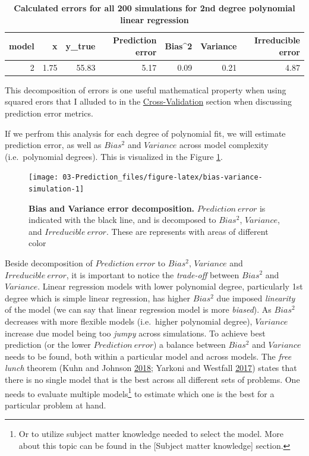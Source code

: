 \documentclass[
]{book}
\begin{document}
\begin{table}

\caption{\label{tab:example-error-decomposition}\textbf{Calculated errors for all 200 simulations for 2nd degree polynomial linear regression}}
\centering
\begin{tabular}[t]{rrrrrrr}
\toprule
model & x & y\_true & Prediction error & Bias\textasciicircum{}2 & Variance & Irreducible error\\
\midrule
2 & 1.75 & 55.83 & 5.17 & 0.09 & 0.21 & 4.87\\
\bottomrule
\end{tabular}
\end{table}

This decomposition of errors is one useful mathematical property when using squared erors that I alluded to in the \protect\hyperlink{cross-validation}{Cross-Validation} section when discussing prediction error metrics.

If we perfrom this analysis for each degree of polynomial fit, we will estimate prediction error, as well as \(Bias^2\) and \(Variance\) across model complexity (i.e.~polynomial degrees). This is visualized in the Figure \ref{fig:bias-variance-simulation}.

\begin{figure}

{\centering \texttt{[image: 03-Prediction\_files/figure-latex/bias-variance-simulation-1]} 

}

\caption{\textbf{Bias and Variance error decomposition. }\(Prediction \: error\) is indicated with the black line, and is decomposed to \(Bias^2\), \(Variance\), and \(Irreducible \: error\). These are represents with areas of different color}\label{fig:bias-variance-simulation}
\end{figure}



Beside decomposition of \(Prediction \: error\) to \(Bias^2\), \(Variance\) and \(Irreducible \: error\), it is important to notice the \emph{trade-off} between \(Bias^2\) and \(Variance\). Linear regression models with lower polynomial degree, particularly 1st degree which is simple linear regression, has higher \(Bias^2\) due imposed \emph{linearity} of the model (we can say that linear regression model is more \emph{biased}). As \(Bias^2\) decreases with more flexible models (i.e.~higher polynomial degree), \(Variance\) increase due model being too \emph{jumpy} across simulations. To achieve best prediction (or the lower \(Prediction \: error\)) a balance between \(Bias^2\) and \(Variance\) needs to be found, both within a particular model and across models. The \emph{free lunch} theorem (Kuhn and Johnson \protect\hyperlink{ref-kuhnAppliedPredictiveModeling2018}{2018}; Yarkoni and Westfall \protect\hyperlink{ref-yarkoniChoosingPredictionExplanation2017}{2017}) states that there is no single model that is the best across all different sets of problems. One needs to evaluate multiple models\footnote{Or to utilize subject matter knowledge needed to select the model. More about this topic can be found in the {[}Subject matter knowledge{]} section.} to estimate which one is the best for a particular problem at hand.
\end{document}
